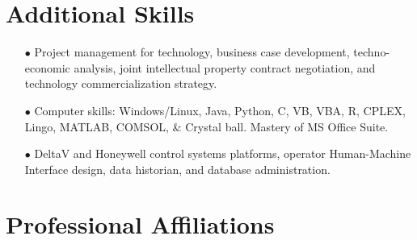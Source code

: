 \documentclass[10pt, letterpaper]{article}
\begin{document}
{\section*{Additional Skills} %
\vspace{5pt}
{\renewcommand{\arraystretch}{0.5}
\begin{itemize}
	\item[\tiny$\bullet$] Project management for technology, business case development, techno-economic analysis, joint intellectual property contract negotiation, and technology commercialization strategy.
		
	\item[\tiny$\bullet$] Computer skills: Windows/Linux, Java, Python, C, VB, VBA, R, CPLEX, Lingo, MATLAB, COMSOL, \& Crystal ball. Mastery of MS Office Suite.
	
	\item[\tiny$\bullet$] DeltaV and Honeywell control systems platforms, operator Human-Machine Interface design, data historian, and database administration.
	
		
	
\end{itemize}


\vspace{8pt}
\section*{Professional Affiliations} %
\vspace{5pt}
{\renewcommand{\arraystretch}{1.1}
	
}}}
\end{document}
